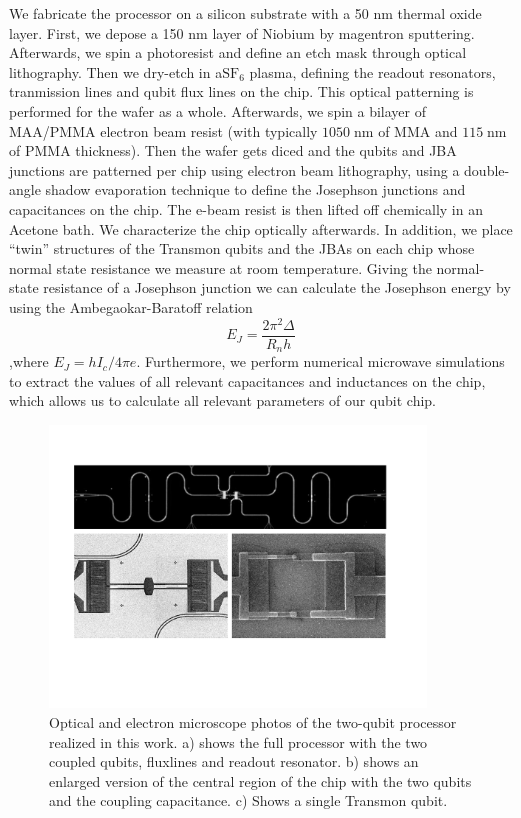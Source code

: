We fabricate the processor on a silicon substrate with a 50 nm thermal oxide layer. First, we depose a 150 nm layer of Niobium by magentron sputtering. Afterwards, we spin a photoresist and define an etch mask through optical lithography. Then we dry-etch in a$\mathrm{SF}_6$ plasma, defining the readout resonators, tranmission lines and qubit flux lines on the chip. This optical patterning is performed for the wafer as a whole. Afterwards, we spin a bilayer of MAA/PMMA electron beam resist (with typically $1050\;\mathrm{nm}$ of MMA and $115\;\mathrm{nm}$ of PMMA thickness). Then the wafer gets diced and the qubits and JBA junctions are patterned per chip using electron beam lithography, using a double-angle shadow evaporation technique to define the Josephson junctions and capacitances on the chip. The e-beam resist is then lifted off chemically in an Acetone bath. We characterize the chip optically afterwards. In addition, we place ``twin'' structures of the Transmon qubits and the JBAs on each chip whose normal state resistance we measure at room temperature. Giving the normal-state resistance of a Josephson junction we can calculate the Josephson energy by using the Ambegaokar-Baratoff relation
%
\begin{equation}
E_J = \frac{2\pi^2 \Delta}{R_n h}
\end{equation}
%
,where $E_J = h I_c / 4\pi e$. Furthermore, we perform numerical microwave simulations to extract the values of all relevant capacitances and inductances on the chip, which allows us to calculate all relevant parameters of our qubit chip.

\begin{figure}
	\includegraphics[width=10cm]{"./material/figures/2-qubit-processor/processor photos"}
	\caption{Optical and electron microscope photos of the two-qubit processor realized in this work. a) shows the full processor with the two coupled qubits, fluxlines and readout resonator. b) shows an enlarged version of the central region of the chip with the two qubits and the coupling capacitance. c) Shows a single Transmon qubit.}
	\label{fig:setup_wiring}
\end{figure}

